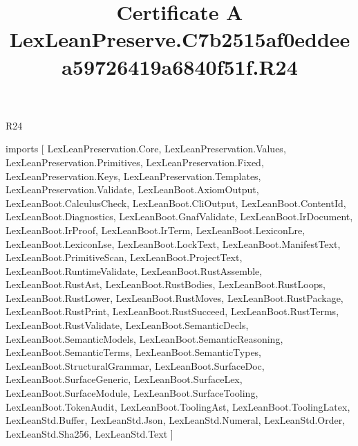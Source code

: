 \begin{lexlean}{R24}
\title{Certificate A LexLeanPreserve.C7b2515af0eddeea59726419a6840f51f.R24}
\begin{coremodule}
imports [
  LexLeanPreservation.Core,
  LexLeanPreservation.Values,
  LexLeanPreservation.Primitives,
  LexLeanPreservation.Fixed,
  LexLeanPreservation.Keys,
  LexLeanPreservation.Templates,
  LexLeanPreservation.Validate,
  LexLeanBoot.AxiomOutput,
  LexLeanBoot.CalculusCheck,
  LexLeanBoot.CliOutput,
  LexLeanBoot.ContentId,
  LexLeanBoot.Diagnostics,
  LexLeanBoot.GnafValidate,
  LexLeanBoot.IrDocument,
  LexLeanBoot.IrProof,
  LexLeanBoot.IrTerm,
  LexLeanBoot.LexiconLre,
  LexLeanBoot.LexiconLse,
  LexLeanBoot.LockText,
  LexLeanBoot.ManifestText,
  LexLeanBoot.PrimitiveScan,
  LexLeanBoot.ProjectText,
  LexLeanBoot.RuntimeValidate,
  LexLeanBoot.RustAssemble,
  LexLeanBoot.RustAst,
  LexLeanBoot.RustBodies,
  LexLeanBoot.RustLoops,
  LexLeanBoot.RustLower,
  LexLeanBoot.RustMoves,
  LexLeanBoot.RustPackage,
  LexLeanBoot.RustPrint,
  LexLeanBoot.RustSucceed,
  LexLeanBoot.RustTerms,
  LexLeanBoot.RustValidate,
  LexLeanBoot.SemanticDecls,
  LexLeanBoot.SemanticModels,
  LexLeanBoot.SemanticReasoning,
  LexLeanBoot.SemanticTerms,
  LexLeanBoot.SemanticTypes,
  LexLeanBoot.StructuralGrammar,
  LexLeanBoot.SurfaceDoc,
  LexLeanBoot.SurfaceGeneric,
  LexLeanBoot.SurfaceLex,
  LexLeanBoot.SurfaceModule,
  LexLeanBoot.SurfaceTooling,
  LexLeanBoot.TokenAudit,
  LexLeanBoot.ToolingAst,
  LexLeanBoot.ToolingLatex,
  LexLeanStd.Buffer,
  LexLeanStd.Json,
  LexLeanStd.Numeral,
  LexLeanStd.Order,
  LexLeanStd.Sha256,
  LexLeanStd.Text
]


\end{coremodule}
\end{lexlean}
